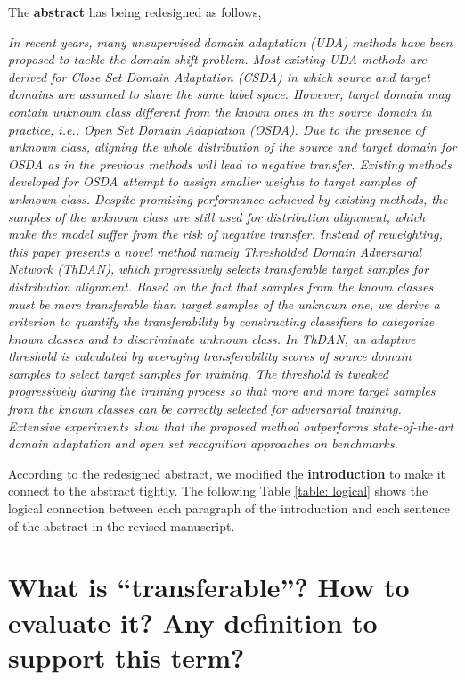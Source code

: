 The \textbf{abstract} has being redesigned as follows,
\begin{siderules}
    \textit{
        \footnotesize
        In recent years, many unsupervised domain adaptation (UDA) methods have been proposed to tackle the domain shift problem.
        Most existing UDA methods are derived for Close Set Domain Adaptation (\textit{CSDA}) in which source and target domains are assumed to share the same label space.
        However, target domain may contain unknown class different from the known ones in the source domain in practice, i.e., Open Set Domain Adaptation (\textit{OSDA}).
        Due to the presence of unknown class, aligning the whole distribution of the source and target domain for OSDA as in the previous methods will lead to negative transfer.
        Existing methods developed for OSDA attempt to assign smaller weights to target samples of unknown class.
        Despite promising performance achieved by existing methods, the samples of the unknown class are still used for distribution alignment, which make the model suffer from the risk of negative transfer.
        Instead of reweighting, this paper presents a novel method namely Thresholded Domain Adversarial Network (\textit{ThDAN}), which progressively selects transferable target samples for distribution alignment.
        Based on the fact that samples from the known classes must be more transferable than target samples of the unknown one, we derive a criterion to quantify the transferability by constructing classifiers to categorize known classes and to discriminate unknown class.
        In ThDAN, an adaptive threshold is calculated by averaging transferability scores of source domain samples to select target samples for training.
        The threshold is tweaked progressively during the training process so that more and more target samples from the known classes can be correctly selected for adversarial training.
        Extensive experiments show that the proposed method outperforms state-of-the-art domain adaptation and open set recognition approaches on benchmarks.
    }
\end{siderules}

According to the redesigned abstract, we modified the \textbf{introduction} to make it connect to the abstract tightly.
The following Table \ref{table: logical} shows the logical connection between each paragraph of the introduction and each sentence of the abstract in the revised manuscript.



\section{What is ``transferable''? How to evaluate it? Any definition to support this term?}
\label{question: transferable}
